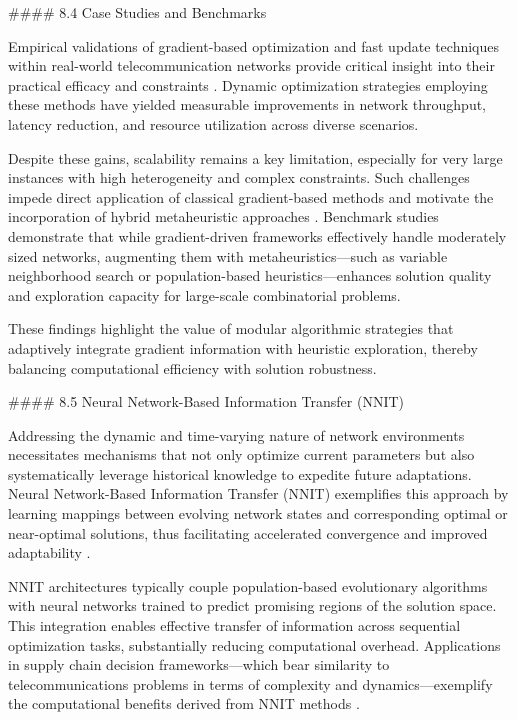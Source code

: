 \documentclass[11pt]{article}
\begin{document}
\begin{itemize}
#### 8.4 Case Studies and Benchmarks

Empirical validations of gradient-based optimization and fast update techniques within real-world telecommunication networks provide critical insight into their practical efficacy and constraints \cite{ref1,ref4,ref10,ref37,ref47}. Dynamic optimization strategies employing these methods have yielded measurable improvements in network throughput, latency reduction, and resource utilization across diverse scenarios.

Despite these gains, scalability remains a key limitation, especially for very large instances with high heterogeneity and complex constraints. Such challenges impede direct application of classical gradient-based methods and motivate the incorporation of hybrid metaheuristic approaches \cite{ref37}. Benchmark studies demonstrate that while gradient-driven frameworks effectively handle moderately sized networks, augmenting them with metaheuristics—such as variable neighborhood search or population-based heuristics—enhances solution quality and exploration capacity for large-scale combinatorial problems.

These findings highlight the value of modular algorithmic strategies that adaptively integrate gradient information with heuristic exploration, thereby balancing computational efficiency with solution robustness.

#### 8.5 Neural Network-Based Information Transfer (NNIT)

Addressing the dynamic and time-varying nature of network environments necessitates mechanisms that not only optimize current parameters but also systematically leverage historical knowledge to expedite future adaptations. Neural Network-Based Information Transfer (NNIT) exemplifies this approach by learning mappings between evolving network states and corresponding optimal or near-optimal solutions, thus facilitating accelerated convergence and improved adaptability \cite{ref38,ref39,ref40,ref47}.

NNIT architectures typically couple population-based evolutionary algorithms with neural networks trained to predict promising regions of the solution space. This integration enables effective transfer of information across sequential optimization tasks, substantially reducing computational overhead. Applications in supply chain decision frameworks—which bear similarity to telecommunications problems in terms of complexity and dynamics—exemplify the computational benefits derived from NNIT methods \cite{ref38}.


\end{itemize}
\end{document}
